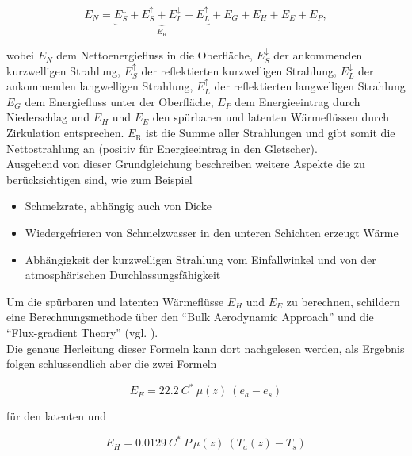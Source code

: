 \documentclass[11pt,a4paper]{article}
\begin{document}
\begin{equation}
E_{N}=\underbrace{E_{S}^{\downarrow}+E_{S}^{\uparrow}+E_{L}^{\downarrow}+E_{L}^{\uparrow}}_{E_{\mathrm{R}}}+E_{G}+E_{H}+E_{E}+E_{P},
\end{equation}

wobei $E_{N}$ dem Nettoenergiefluss in die Oberfläche, $E_{S}^{\downarrow}$ der ankommenden kurzwelligen Strahlung, $E_{S}^{\uparrow}$ der reflektierten kurzwelligen Strahlung, $E_{L}^{\downarrow}$ der ankommenden langwelligen Strahlung, $E_{L}^{\uparrow}$ der reflektierten langwelligen Strahlung $E_{G}$ dem Energiefluss unter der Oberfläche, $E_{P}$ dem Energieeintrag durch Niederschlag und $E_{H}$ und $E_{E}$ den spürbaren und latenten Wärmeflüssen durch Zirkulation entsprechen. $E_{\mathrm{R}}$ ist die Summe aller Strahlungen und gibt somit die Nettostrahlung an (positiv für Energieeintrag in den Gletscher).\\

Ausgehend von dieser Grundgleichung beschreiben \citeauthor{ThePhysicsOfGlaciers} weitere Aspekte die zu berücksichtigen sind, wie zum Beispiel 

\begin{itemize}
\item{Schmelzrate, abhängig auch von Dicke }
\item{Wiedergefrieren von Schmelzwasser in den unteren Schichten erzeugt Wärme}
\item{Abhängigkeit der kurzwelligen Strahlung vom Einfallwinkel und von der atmosphärischen Durchlassungsfähigkeit}
\end{itemize}

Um die spürbaren und latenten Wärmeflüsse $E_{H}$ und $E_{E}$ zu berechnen, schildern \citeauthor{ThePhysicsOfGlaciers} eine Berechnungsmethode über den ``Bulk Aerodynamic Approach'' und die ``Flux-gradient Theory'' (vgl. \cite[153-157]{ThePhysicsOfGlaciers}).\\
Die genaue Herleitung dieser Formeln kann dort nachgelesen werden, als Ergebnis folgen schlussendlich aber die zwei Formeln

\begin{equation}\label{eq:Berechnung latenter Energiefluss}
E_{E}= 22.2~C^*~\mu(z)~(e_a-e_s)
\end{equation}

für den latenten und

\begin{equation}\label{eq:Berechnung sensibler Energiefluss}
E_{H}= 0.0129~C^*~P~\mu(z)~(T_a(z)-T_s)
\end{equation}
\end{document}
